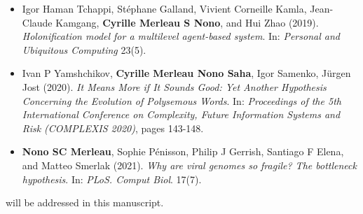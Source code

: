 \begin{itemize}
	
	\item Igor Haman Tchappi, Stéphane Galland, Vivient Corneille Kamla, Jean-Claude Kamgang, \textbf{Cyrille Merleau S Nono}, and Hui Zhao (2019). \emph{Holonification model for a multilevel agent-based system}. In: \textit{Personal and Ubiquitous Computing} 23(5).
	
	\item Ivan P Yamshchikov, \textbf{Cyrille Merleau Nono Saha}, Igor Samenko, Jürgen Jost (2020). \emph{It Means More if It Sounds Good: Yet Another Hypothesis Concerning the Evolution of Polysemous Words}. In: \textit{Proceedings of the 5th International Conference on Complexity, Future Information Systems and Risk (COMPLEXIS 2020)}, pages 143-148.
	
	\item  \textbf{Nono SC Merleau}, Sophie Pénisson, Philip J Gerrish, Santiago F Elena, and Matteo Smerlak (2021). \emph{Why are viral genomes so fragile? The bottleneck hypothesis}. In: \textit{PLoS. Comput Biol}. 17(7). %
	

\end{itemize}
will be addressed in this manuscript.